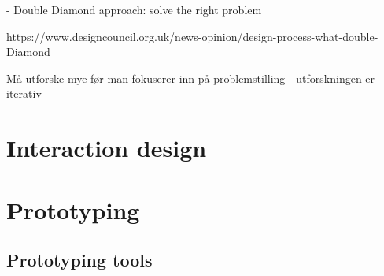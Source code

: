 - Double Diamond approach: solve the right problem

https://www.designcouncil.org.uk/news-opinion/design-process-what-double-Diamond

Må utforske mye før man fokuserer inn på problemstilling - utforskningen er iterativ

\section{Interaction design}



\section{Prototyping}

\subsection{Prototyping tools}

